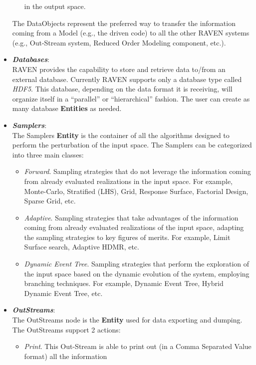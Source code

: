 \begin{itemize}
\begin{itemize}
                                               in the output space.
     \end{itemize}
     The DataObjects represent the preferred way to transfer the information coming from a Model (e.g., the driven code) to
      all the other RAVEN systems (e.g., Out-Stream system, Reduced Order Modeling component, etc.).
  \item \textit{\textbf{Databases}}:
      \\ RAVEN provides the capability to store and retrieve data to/from an external database. Currently RAVEN supports
       only a database type called \textit{HDF5}. This database, depending on the data format it is receiving, will
       organize itself in a ``parallel'' or ``hierarchical'' fashion. The user can create as many database \textbf{Entities} as needed.
  \item \textit{\textbf{Samplers}}:
  \\ The Samplers  \textbf{Entity} is the container of all the algorithms designed to perform the perturbation of the input space.
      The Samplers can be categorized into three main classes:
      \begin{itemize}
        \item  \textit{Forward}. Sampling strategies that do not leverage the information coming from already evaluated
        realizations in the input space. For example, Monte-Carlo, Stratified (LHS), Grid, Response Surface, Factorial Design,
        Sparse Grid, etc.
        \item  \textit{Adaptive}. Sampling strategies that take advantages of the information coming from already evaluated
        realizations of the input space, adapting the sampling strategies to key figures of merits. For example, Limit Surface
        search, Adaptive HDMR, etc.
        \item \textit{Dynamic Event Tree}. Sampling strategies that perform the exploration of the input space based on the
        dynamic evolution of the system, employing branching techniques. For example, Dynamic Event Tree, Hybrid
        Dynamic Event Tree, etc.
      \end{itemize}
  \item \textit{\textbf{OutStreams}}:
  \\ The OutStreams node is the \textbf{Entity} used for data exporting and dumping. The OutStreams support
   2 actions:
      \begin{itemize}
       \item \textit{Print}. This Out-Stream is able to print out (in a Comma Separated Value format) all the information

\end{itemize}
\end{itemize}
